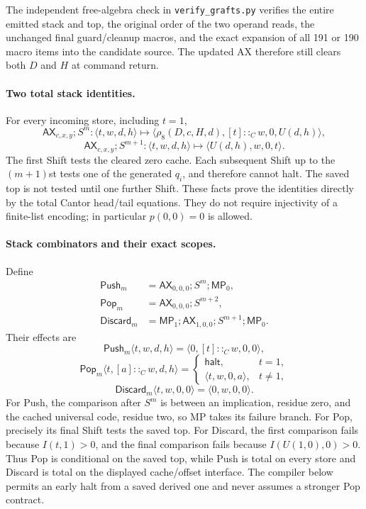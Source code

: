 The independent free-algebra check in \texttt{verify\_grafts.py} verifies
the entire emitted stack and top, the original order of the two operand
reads, the unchanged final guard/cleanup macros, and the exact expansion
of all 191 or 190 macro items into the candidate source. The updated AX
therefore still clears both $D$ and $H$ at command return.

\paragraph{Two total stack identities.}
For every incoming store, including $t=1$,
\[
 \mathsf{AX}_{c,x,y};S^m:
 \langle t,w,d,h\rangle\longmapsto
 \langle\rho_8(D,c,H,d),[t]::_Cw,0,U(d,h)\rangle,
\]
\[
 \mathsf{AX}_{c,x,y};S^{m+1}:
 \langle t,w,d,h\rangle\longmapsto
 \langle U(d,h),w,0,t\rangle.
\]
The first Shift tests the cleared zero cache. Each subsequent Shift up to
the $(m+1)$st tests one of the generated $q_i$, and therefore cannot halt.
The saved top is not tested until one further Shift. These facts prove
the identities directly by the total Cantor head/tail equations. They do
not require injectivity of a finite-list encoding; in particular
$p(0,0)=0$ is allowed.

\paragraph{Stack combinators and their exact scopes.}
Define
\[
\begin{aligned}
 \mathsf{Push}_m&=\mathsf{AX}_{0,0,0};S^m;\mathsf{MP}_0,\\
 \mathsf{Pop}_m&=\mathsf{AX}_{0,0,0};S^{m+2},\\
 \mathsf{Discard}_m&=\mathsf{MP}_1;\mathsf{AX}_{1,0,0};
                       S^{m+1};\mathsf{MP}_0.
\end{aligned}
\]
Their effects are
\[
 \mathsf{Push}_m\langle t,w,d,h\rangle
   =\langle0,[t]::_Cw,0,0\rangle,
\]
\[
 \mathsf{Pop}_m\langle t,[a]::_Cw,d,h\rangle
   =\begin{cases}\mathsf{halt},&t=1,\\
                  \langle t,w,0,a\rangle,&t\ne1,
     \end{cases}
\]
\[
 \mathsf{Discard}_m\langle t,w,0,0\rangle
   =\langle0,w,0,0\rangle.
\]
For Push, the comparison after $S^m$ is between an implication, residue
zero, and the cached universal code, residue two, so MP takes its failure
branch. For Pop, precisely its final Shift tests the saved top. For
Discard, the first comparison fails because $I(t,1)>0$, and the final
comparison fails because $I(U(1,0),0)>0$. Thus Pop is conditional on the
saved top, while Push is total on every store and Discard is total on the
displayed cache/offset interface. The compiler below permits an early halt
from a saved derived one and never assumes a stronger Pop contract.

